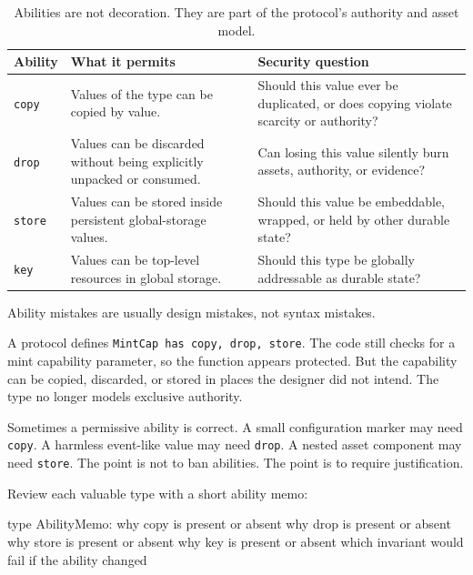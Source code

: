 \begin{table}[htbp]
\centering
\small
\renewcommand{\arraystretch}{1.18}
\begin{tabularx}{\textwidth}{@{}>{\RaggedRight\arraybackslash}p{}>{\RaggedRight\arraybackslash}p{}X@{}}
\toprule
Ability & What it permits & Security question \\
\midrule
\texttt{copy} & Values of the type can be copied by value. & Should this value ever be duplicated, or does copying violate scarcity or authority? \\
\texttt{drop} & Values can be discarded without being explicitly unpacked or consumed. & Can losing this value silently burn assets, authority, or evidence? \\
\texttt{store} & Values can be stored inside persistent global-storage values. & Should this value be embeddable, wrapped, or held by other durable state? \\
\texttt{key} & Values can be top-level resources in global storage. & Should this type be globally addressable as durable state? \\
\bottomrule
\end{tabularx}
\caption{Abilities are not decoration. They are part of the protocol's authority and asset model.}
\end{table}

Ability mistakes are usually design mistakes, not syntax mistakes.

\begin{failuremodebox}
A protocol defines \texttt{MintCap has copy, drop, store}. The code still checks for a mint capability parameter, so the function appears protected. But the capability can be copied, discarded, or stored in places the designer did not intend. The type no longer models exclusive authority.
\end{failuremodebox}

Sometimes a permissive ability is correct. A small configuration marker may need \texttt{copy}. A harmless event-like value may need \texttt{drop}. A nested asset component may need \texttt{store}. The point is not to ban abilities. The point is to require justification.

Review each valuable type with a short ability memo:

\begin{codeblock}
type AbilityMemo:
    why copy is present or absent
    why drop is present or absent
    why store is present or absent
    why key is present or absent
    which invariant would fail if the ability changed
\end{codeblock}


